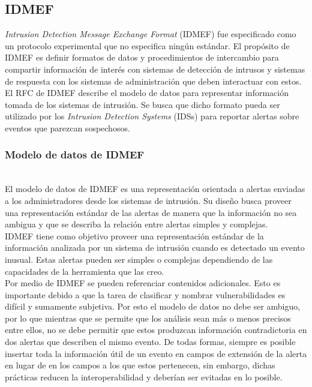 \subsection{IDMEF}

\textit{Intrusion Detection Message Exchange Format} (IDMEF) fue especificado como un 
protocolo experimental que no especifica ningún estándar. El propósito de 
IDMEF es definir formatos de datos y procedimientos de intercambio para 
compartir información de interés con sistemas de detección de intrusos y 
sistemas de respuesta con los sistemas de administración que deben 
interactuar con estos. El RFC de IDMEF describe el modelo de datos para 
representar información tomada de los sistemas de intrusión. Se busca que dicho 
formato pueda ser utilizado por los \textit{Intrusion Detection Systems} (IDSs) para 
reportar alertas sobre eventos que parezcan sospechosos.\\

\subsubsection{Modelo de datos de IDMEF}\ \\
El modelo de datos de IDMEF es una representación orientada a alertas enviadas a 
los administradores desde los sistemas de intrusión. Su diseño busca proveer una representación estándar de las 
alertas de manera que la información no sea ambigua y que se describa la 
relación entre alertas simples y complejas.\\

IDMEF tiene como objetivo proveer una representación estándar de la 
información analizada por un sistema de intrusión cuando es detectado 
un evento inusual. Estas alertas pueden ser simples o complejas 
dependiendo de las capacidades de la herramienta que las creo.\\

Por medio de IDMEF se pueden referenciar contenidos adicionales.
Esto es importante debido a que la tarea de clasificar y nombrar vulnerabilidades es 
difícil y sumamente subjetiva. Por esto el modelo de datos no debe ser ambiguo, por lo 
que mientras que se permite que los análisis sean más o menos precisos 
entre ellos, no se debe permitir que estos produzcan información contradictoria  
en dos alertas que describen el mismo evento. De todas formas, siempre es 
posible insertar toda la información útil de un evento en campos de extensión 
de la alerta en lugar de en los campos a los que estos pertenecen, sin embargo, 
dichas prácticas reducen la interoperabilidad y deberían ser evitadas en lo 
posible.


